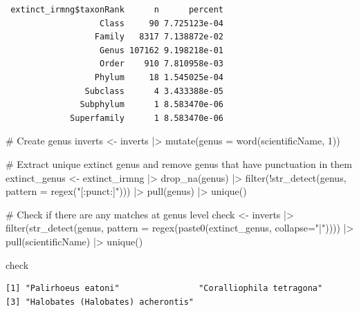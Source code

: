 \documentclass[
  letterpaper,
  DIV=11,
  numbers=noendperiod,
  oneside]{scrreprt}
\newenvironment{Shaded}{\begin{snugshade}}{\end{snugshade}}
\newcommand{\AttributeTok}[1]{\textcolor[rgb]{0.40,0.45,0.13}{#1}}
\newcommand{\CommentTok}[1]{\textcolor[rgb]{0.37,0.37,0.37}{#1}}
\newcommand{\DecValTok}[1]{\textcolor[rgb]{0.68,0.00,0.00}{#1}}
\newcommand{\FunctionTok}[1]{\textcolor[rgb]{0.28,0.35,0.67}{#1}}
\newcommand{\NormalTok}[1]{\textcolor[rgb]{0.00,0.23,0.31}{#1}}
\newcommand{\OtherTok}[1]{\textcolor[rgb]{0.00,0.23,0.31}{#1}}
\newcommand{\SpecialCharTok}[1]{\textcolor[rgb]{0.37,0.37,0.37}{#1}}
\newcommand{\StringTok}[1]{\textcolor[rgb]{0.13,0.47,0.30}{#1}}
\begin{document}
\begin{verbatim}
 extinct_irmng$taxonRank      n      percent
                   Class     90 7.725123e-04
                  Family   8317 7.138872e-02
                   Genus 107162 9.198218e-01
                   Order    910 7.810958e-03
                  Phylum     18 1.545025e-04
                Subclass      4 3.433388e-05
               Subphylum      1 8.583470e-06
             Superfamily      1 8.583470e-06
\end{verbatim}

\begin{Shaded}
\begin{Highlighting}[]
\CommentTok{\# Create genus }
\NormalTok{inverts }\OtherTok{\textless{}{-}}\NormalTok{ inverts }\SpecialCharTok{|\textgreater{}} 
  \FunctionTok{mutate}\NormalTok{(}\AttributeTok{genus =} \FunctionTok{word}\NormalTok{(scientificName, }\DecValTok{1}\NormalTok{)) }

\CommentTok{\# Extract unique extinct genus and remove genus that have punctuation in them}
\NormalTok{extinct\_genus }\OtherTok{\textless{}{-}}\NormalTok{ extinct\_irmng }\SpecialCharTok{|\textgreater{}} 
  \FunctionTok{drop\_na}\NormalTok{(genus) }\SpecialCharTok{|\textgreater{}} 
  \FunctionTok{filter}\NormalTok{(}\SpecialCharTok{!}\FunctionTok{str\_detect}\NormalTok{(genus, }\AttributeTok{pattern =} \FunctionTok{regex}\NormalTok{(}\StringTok{"[:punct:]"}\NormalTok{))) }\SpecialCharTok{|\textgreater{}} 
  \FunctionTok{pull}\NormalTok{(genus) }\SpecialCharTok{|\textgreater{}} 
  \FunctionTok{unique}\NormalTok{() }
 
\CommentTok{\# Check if there are any matches at genus level}
\NormalTok{check }\OtherTok{\textless{}{-}}\NormalTok{ inverts }\SpecialCharTok{|\textgreater{}} 
\FunctionTok{filter}\NormalTok{(}\FunctionTok{str\_detect}\NormalTok{(genus, }\AttributeTok{pattern =} \FunctionTok{regex}\NormalTok{(}\FunctionTok{paste0}\NormalTok{(extinct\_genus, }\AttributeTok{collapse=}\StringTok{"|"}\NormalTok{)))) }\SpecialCharTok{|\textgreater{}} 
  \FunctionTok{pull}\NormalTok{(scientificName) }\SpecialCharTok{|\textgreater{}} 
  \FunctionTok{unique}\NormalTok{() }

\NormalTok{check}
\end{Highlighting}
\end{Shaded}

\begin{verbatim}
[1] "Palirhoeus eatoni"                "Coralliophila tetragona"         
[3] "Halobates (Halobates) acherontis"
\end{verbatim}
\end{document}
